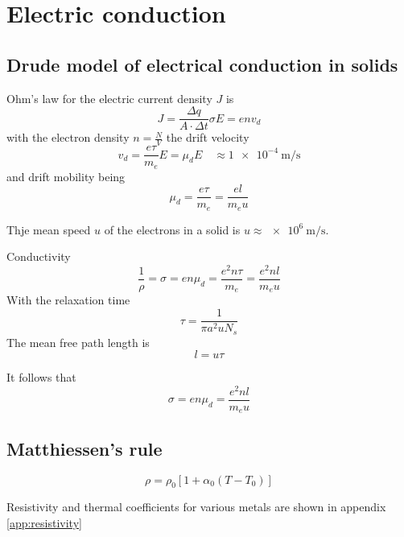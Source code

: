 \section{Electric conduction}

\subsection{Drude model of electrical conduction in solids}

Ohm's law for the electric current density $J$ is
\begin{equation}
    J = \frac{\Delta q}{A \cdot \Delta t}\sigma E = e n v_d
\end{equation}
with the electron density $n = \frac{N}{V}$ the drift velocity
\begin{equation}
    v_d = \frac{e \tau}{m_e} E = \mu_d E \quad \approx \SI{1e-4}{\meter\per\second}
\end{equation}
and drift mobility being
\begin{equation}
    \mu_d = \frac{e \tau}{m_e} = \frac{e l}{m_e u}
\end{equation}

Thje mean speed $u$ of the electrons in a solid is $u\approx\SI{e6}{\meter\per\second}$.

Conductivity
\begin{equation}
    \frac{1}{\rho} = \sigma = e n \mu_d = \frac{e^2 n \tau}{m_e} = \frac{e^2 n l}{m_e u}
\end{equation}
With the relaxation time
\begin{equation}
    \tau = \frac{1}{\pi a^2 u N_s}
\end{equation}
The mean free path length is
\begin{equation}
    l = u \tau
\end{equation}

It follows that
\begin{equation}
    \sigma = e n \mu_d = \frac{e^2 n l}{m_e u}
\end{equation}

\subsection{Matthiessen's rule}
\begin{equation}
    \rho = \rho_0 \left[ 1 + \alpha_0 \left( T - T_0 \right) \right]
\end{equation}

Resistivity and thermal coefficients for various metals are shown in appendix \ref{app:resistivity}

